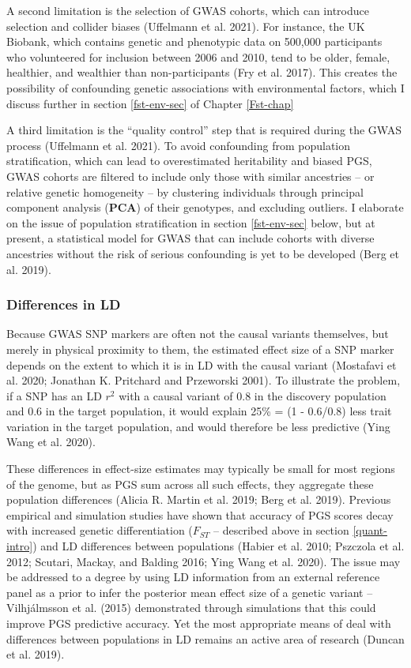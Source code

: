 \documentclass[
]{book}
\begin{document}
A second limitation is the selection of GWAS cohorts, which can introduce selection and collider biases (Uffelmann et al. 2021). For instance, the UK Biobank, which contains genetic and phenotypic data on 500,000 participants who volunteered for inclusion between 2006 and 2010, tend to be older, female, healthier, and wealthier than non-participants (Fry et al. 2017). This creates the possibility of confounding genetic associations with environmental factors, which I discuss further in section \ref{fst-env-sec} of Chapter \ref{Fst-chap}

A third limitation is the ``quality control'' step that is required during the GWAS process (Uffelmann et al. 2021). To avoid confounding from population stratification, which can lead to overestimated heritability and biased PGS, GWAS cohorts are filtered to include only those with similar ancestries -- or relative genetic homogeneity -- by clustering individuals through principal component analysis (\textbf{PCA}) of their genotypes, and excluding outliers. I elaborate on the issue of population stratification in section \ref{fst-env-sec} below, but at present, a statistical model for GWAS that can include cohorts with diverse ancestries without the risk of serious confounding is yet to be developed (Berg et al. 2019).

\hypertarget{differences-in-ld}{%
\subsubsection{Differences in LD}\label{differences-in-ld}}

Because GWAS SNP markers are often not the causal variants themselves, but merely in physical proximity to them, the estimated effect size of a SNP marker depends on the extent to which it is in LD with the causal variant (Mostafavi et al. 2020; Jonathan K. Pritchard and Przeworski 2001). To illustrate the problem, if a SNP has an LD \(r^2\) with a causal variant of 0.8 in the discovery population and 0.6 in the target population, it would explain 25\% = (1 - 0.6/0.8) less trait variation in the target population, and would therefore be less predictive (Ying Wang et al. 2020).

These differences in effect-size estimates may typically be small for most regions of the genome, but as PGS sum across all such effects, they aggregate these population differences (Alicia R. Martin et al. 2019; Berg et al. 2019). Previous empirical and simulation studies have shown that accuracy of PGS scores decay with increased genetic differentiation (\(F_{ST}\) -- described above in section \ref{quant-intro}) and LD differences between populations (Habier et al. 2010; Pszczola et al. 2012; Scutari, Mackay, and Balding 2016; Ying Wang et al. 2020). The issue may be addressed to a degree by using LD information from an external reference panel as a prior to infer the posterior mean effect size of a genetic variant -- Vilhjálmsson et al. (2015) demonstrated through simulations that this could improve PGS predictive accuracy. Yet the most appropriate means of deal with differences between populations in LD remains an active area of research (Duncan et al. 2019).
\end{document}
